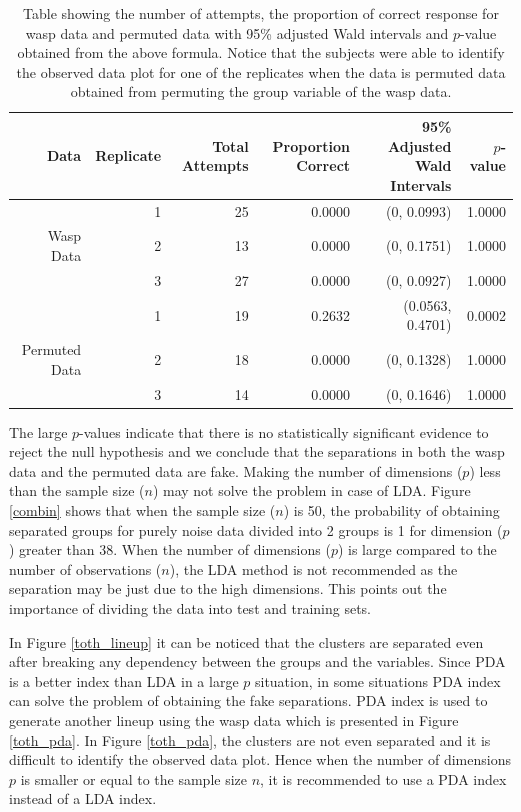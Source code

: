 \documentclass[12]{article}
\begin{document}
\begin{table}[ht]
\begin{center}
\caption{Table showing the number of attempts, the proportion of correct response for wasp data and permuted data with 95\% adjusted Wald intervals and $p$-value obtained from the above formula. Notice that the subjects were able to identify the observed data plot for one of the replicates when the data is permuted data obtained from permuting the group variable of the wasp data.}
\vspace{0.15cm}
\begin{tabular}{rr|rrrr}
\hline
  \hline
 Data & Replicate & Total Attempts & Proportion Correct & 95\% Adjusted Wald Intervals  & $p$-value\\ 
  \hline
  & 1 & 25 & 0.0000 & (0, 0.0993) & 1.0000\\
Wasp Data & 2 & 13 & 0.0000 & (0, 0.1751)  & 1.0000\\ 
 & 3 & 27 & 0.0000 & (0, 0.0927) & 1.0000\\
 \hline
 & 1 & 19 & 0.2632 & (0.0563, 0.4701) & 0.0002\\
Permuted Data & 2 & 18 & 0.0000 & (0, 0.1328) & 1.0000 \\ 
 & 3 & 14 & 0.0000 & (0, 0.1646) & 1.0000\\
   \hline
\end{tabular}
\label{wasp}
\end{center}
\end{table}

The large $p$-values indicate that there is no statistically significant evidence to reject the null hypothesis and we conclude that the separations in both the wasp data and the permuted data are fake. Making the number of dimensions ($p$) less than the sample size ($n$) may not solve the problem in case of LDA. Figure \ref{combin} shows that when the sample size ($n$) is 50, the probability of obtaining separated groups for purely noise data divided into 2 groups is 1 for dimension ($p$) greater than 38. When the number of dimensions ($p$) is large compared to the number of observations ($n$), the LDA method is not recommended as the separation may be just due to the high dimensions. This points out the importance of dividing the data into test and training sets.  



In Figure \ref{toth_lineup} it can be noticed that the clusters are separated even after breaking any dependency between the groups and the variables. Since PDA is a better index than LDA in a large $p$ situation, in some situations PDA index can solve the problem of obtaining the fake separations. PDA index is used to generate another lineup using the wasp data which is presented in Figure \ref{toth_pda}. In Figure \ref{toth_pda}, the clusters are not even separated and it is difficult to identify the observed data plot. Hence when the number of dimensions $p$ is smaller or equal to the sample size $n$, it is recommended to use a PDA index instead of a LDA index. 
\end{document}
